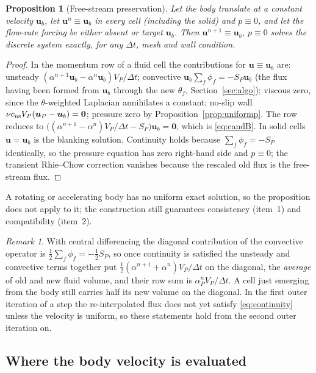 \documentclass[11pt,a4paper]{article}
\newtheorem{proposition}{Proposition}
\theoremstyle{remark}
\newtheorem{remark}{Remark}
\newcommand{\uu}{\bm{u}}
\newcommand{\ub}{\uu_b}
\newcommand{\dt}{\Delta t}
\newcommand{\cns}{c_{\rm ns}}
\begin{document}
\begin{proposition}[Free-stream preservation]
\label{prop:freestream}
Let the body translate at a constant velocity $\ub$, let $\uu^n\equiv\ub$ in every cell
(including the solid) and $p\equiv0$, and let the flow-rate forcing be either absent or target
$\ub$. Then $\uu^{n+1}\equiv\ub$, $p\equiv0$ solves the discrete system exactly, for any $\dt$,
mesh and wall condition.
\end{proposition}
\begin{proof}
In the momentum row of a fluid cell the contributions for $\uu\equiv\ub$ are: unsteady
$(\alpha^{n+1}\ub-\alpha^n\ub)V_P/\dt$; convective $\ub\sum_f\phi_f=-S_P\ub$ (the flux having
been formed from $\ub$ through the new $\theta_f$, Section~\ref{sec:algo}); viscous zero, since
the $\theta$-weighted Laplacian annihilates a constant; no-slip wall
$\nu\cns V_P(\uu_P-\ub)=\bm 0$; pressure zero by Proposition~\ref{prop:uniformp}. The row
reduces to $\big((\alpha^{n+1}-\alpha^n)V_P/\dt-S_P\big)\ub=\bm 0$, which is \eqref{eq:candB}.
In solid cells $\uu=\ub$ is the blanking solution. Continuity holds because $\sum_f\phi_f=-S_P$
identically, so the pressure equation has zero right-hand side and $p\equiv0$; the transient
Rhie--Chow correction vanishes because the rescaled old flux is the free-stream flux.
\end{proof}

A rotating or accelerating body has no uniform exact solution, so the proposition does not
apply to it; the construction still guarantees consistency (item~1) and compatibility
(item~2).

\begin{remark}
With central differencing the diagonal contribution of the convective operator is
$\tfrac12\sum_f\phi_f=-\tfrac12S_P$, so once continuity is satisfied the unsteady and
convective terms together put $\tfrac12(\alpha^{n+1}+\alpha^n)V_P/\dt$ on the diagonal, the
\emph{average} of old and new fluid volume, and their row sum is $\alpha^n_PV_P/\dt$. A cell
just emerging from the body still carries half its new volume on the diagonal. In the first
outer iteration of a step the re-interpolated flux does not yet satisfy
\eqref{eq:continuity} unless the velocity is uniform, so these statements hold from the second
outer iteration on.
\end{remark}

\subsection{Where the body velocity is evaluated}
\label{sec:ubpoint}
\end{document}
